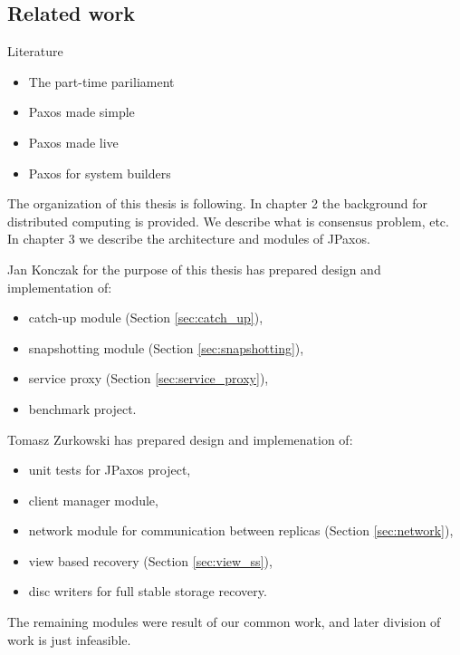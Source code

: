 \begin{TODO}

\section{Related work}
Literature

\begin{itemize}
  \item The part-time pariliament
  \item Paxos made simple
  \item Paxos made live
  \item Paxos for system builders
\end{itemize}

\end{TODO}

\begin{TODO}
The organization of this thesis is following. In chapter 2 the background for distributed computing is provided. We describe what is consensus problem, etc. In chapter 3 we describe the architecture and modules of JPaxos.
\end{TODO}

Jan Konczak for the purpose of this thesis has prepared design and implementation of:
\begin{itemize}
  \item catch-up module (Section \ref{sec:catch_up}),
  \item snapshotting module (Section \ref{sec:snapshotting}),
  \item service proxy (Section \ref{sec:service_proxy}),
  \item benchmark project.
\end{itemize}

Tomasz Zurkowski has prepared design and implemenation of:
\begin{itemize}
  \item unit tests for JPaxos project,
  \item client manager module, 
  \item network module for communication between replicas (Section \ref{sec:network}),
  \item view based recovery (Section \ref{sec:view_ss}),
  \item disc writers for full stable storage recovery.
\end{itemize}

The remaining modules were result of our common work, and later division of work is just infeasible.
